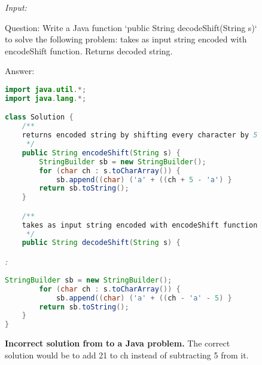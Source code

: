 \begin{figure}[htbp]
\hrulefill

\emph{Input:}

\hrulefill

Question: Write a Java function `public String decodeShift(String s)` to solve the following problem:
takes as input string encoded with encodeShift function. Returns decoded string.


Answer: 
\begin{lstlisting}[language=Java,breaklines=true,basicstyle=\ttfamily\scriptsize]
import java.util.*;
import java.lang.*;

class Solution {
    /**
    returns encoded string by shifting every character by 5 in the alphabet.
     */
    public String encodeShift(String s) {
        StringBuilder sb = new StringBuilder();
        for (char ch : s.toCharArray()) {
            sb.append((char) ('a' + ((ch + 5 - 'a') }
        return sb.toString();
    }

    /**
    takes as input string encoded with encodeShift function. Returns decoded string.
     */
    public String decodeShift(String s) {
\end{lstlisting}

\hrulefill

\emph{\model{}:}

\hrulefill

\begin{lstlisting}[language=Java,breaklines=true,basicstyle=\ttfamily\scriptsize]
        StringBuilder sb = new StringBuilder();
        for (char ch : s.toCharArray()) {
            sb.append((char) ('a' + ((ch - 'a' - 5) }
        return sb.toString();
    }
}
\end{lstlisting}
\caption{\textbf{Incorrect solution from \model{} to a \evals{} Java problem.} The correct solution would be to add 21 to ch instead of subtracting 5 from it.}
\label{fig:modeljava}
\end{figure}


